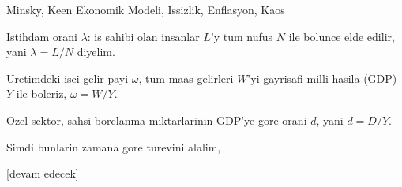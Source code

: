\documentclass[12pt,fleqn]{article}\usepackage{../../common}
\begin{document}
Minsky, Keen Ekonomik Modeli, Issizlik, Enflasyon, Kaos


Istihdam orani $\lambda$: is sahibi olan insanlar $L$'y tum nufus $N$ ile
bolunce elde edilir, yani $\lambda = L/N$ diyelim.

Uretimdeki isci gelir payi $\omega$, tum maas gelirleri $W$'yi gayrisafi
milli hasila (GDP) $Y$ ile boleriz, $\omega = W/Y$. 

Ozel sektor, sahsi borclanma miktarlarinin GDP'ye gore orani $d$, yani $d =
D/Y$. 

Simdi bunlarin zamana gore turevini alalim, 














[devam edecek]
\end{document}
